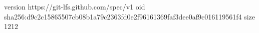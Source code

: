 version https://git-lfs.github.com/spec/v1
oid sha256:d9c2c15865507cb08b1a79c2363fd0e2f96161369faf3dee0af9c016119561f4
size 1212
